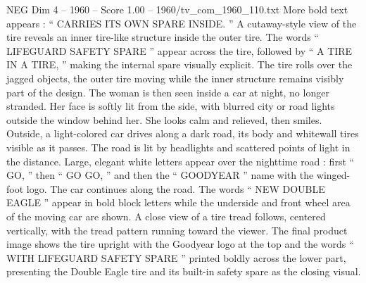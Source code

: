 \begin{textsample}{NEG Dim 4 – 1960 – Score 1.00 – 1960/tv\_com\_1960\_110.txt}
More bold text appears : “ CARRIES ITS OWN SPARE INSIDE. ” A cutaway-style view of the tire reveals an inner tire-like structure inside the outer tire.
The words “ LIFEGUARD SAFETY SPARE ” appear across the tire, followed by “ A TIRE IN A TIRE, ” making the internal spare visually explicit.
The tire rolls over the jagged objects, the outer tire moving while the inner structure remains visibly part of the design.
The woman is then seen inside a car at night, no longer stranded.
Her face is softly lit from the side, with blurred city or road lights outside the window behind her.
She looks calm and relieved, then smiles.
Outside, a light-colored car drives along a dark road, its body and whitewall tires visible as it passes.
The road is lit by headlights and scattered points of light in the distance.
Large, elegant white letters appear over the nighttime road : first “ GO, ” then “ GO GO, ” and then the “ GOODYEAR ” name with the winged-foot logo.
The car continues along the road.
The words “ NEW DOUBLE EAGLE ” appear in bold block letters while the underside and front wheel area of the moving car are shown.
A close view of a tire tread follows, centered vertically, with the tread pattern running toward the viewer.
The final product image shows the tire upright with the Goodyear logo at the top and the words “ WITH LIFEGUARD SAFETY SPARE ” printed boldly across the lower part, presenting the Double Eagle tire and its built-in safety spare as the closing visual.

\end{textsample}
